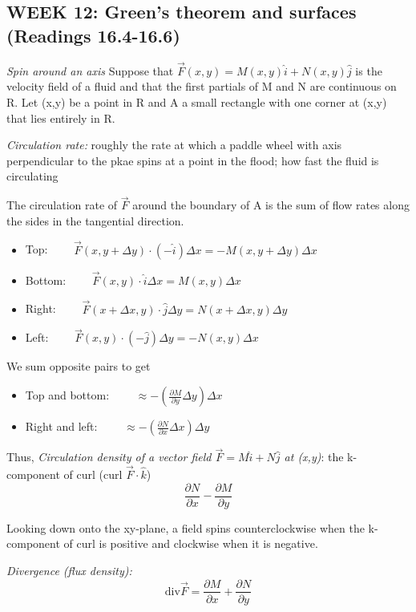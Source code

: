 \documentclass[12pt]{article}
\begin{document}
\subsection{WEEK 12: Green's theorem and surfaces (Readings 16.4-16.6)}

\emph{Spin around an axis}
Suppose that $\vec{F}(x,y)  = M(x,y) \hat{i} + N(x,y) \hat{j}$ is the velocity field of a fluid and that the first partials of M and N are continuous on R. Let (x,y) be a point in R and A a small rectangle with one corner at (x,y) that lies entirely in R. 

\emph{Circulation rate:} roughly the rate at which a paddle wheel with axis perpendicular to the pkae spins at a point in the flood; how fast the fluid is circulating

The circulation rate of $\vec{F}$ around the boundary of A is the sum of flow rates along the sides in the tangential direction.
\begin{itemize}
    \item Top: $\quad \quad \vec{F}(x,y + \Delta y) \cdot (-\hat{i}) \Delta x = - M(x, y + \Delta y) \Delta x$
    \item Bottom: $\quad \quad \vec{F}(x,y) \cdot \hat{i} \Delta x = M(x, y) \Delta x$
    \item Right: $\quad \quad \vec{F}(x + \Delta x,y) \cdot \hat{j} \Delta y = N(x + \Delta x, y) \Delta y$
    \item Left: $\quad \quad \vec{F}(x,y) \cdot (-\hat{j}) \Delta y = - N(x, y) \Delta x$
\end{itemize}

We sum opposite pairs to get 
\begin{itemize}
    \item Top and bottom: $\quad \quad \approx -\left(\frac{\partial M}{\partial y} \Delta y\right) \Delta x$
    \item Right and left: $\quad \quad \approx -\left(\frac{\partial N}{\partial x} \Delta x\right) \Delta y$
\end{itemize}

Thus, 
\emph{Circulation density of a vector field $\vec{F}= M \hat{i} + N \hat{j}$ at (x,y)}: the k-component of curl (curl $\vec{F} \cdot \hat{k}$)
\[\frac{\partial N}{\partial x} - \frac{\partial M}{\partial y}\]

Looking down onto the xy-plane, a field spins counterclockwise when the k-component of curl is positive and clockwise when it is negative.

\emph{Divergence (flux density):}
\[\text{div} \vec{F} = \frac{\partial M}{\partial x} + \frac{\partial N}{\partial y}\]
\end{document}
